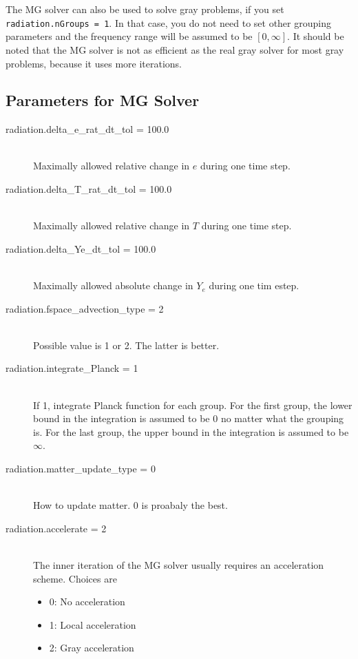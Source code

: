 \documentclass[11pt,letterpaper]{article}
\begin{document}
The MG solver can also be used to solve gray problems, if you set {\tt
  radiation.nGroups = 1}.  In that case, you do not need to set other
grouping parameters and the frequency range will be assumed to be $[0,
\infty]$. It should be noted that the MG solver is not as efficient as
the real gray solver for most gray problems, because it uses more
iterations.

\subsection{Parameters for MG Solver}
\label{sec:mgpar}

\begin{description}
\item[radiation.delta\_e\_rat\_dt\_tol = 100.0] \hfill \\
  Maximally allowed relative change in $e$ during one time step.
\item[radiation.delta\_T\_rat\_dt\_tol = 100.0] \hfill \\
  Maximally allowed relative change in $T$ during one time step.
\item[radiation.delta\_Ye\_dt\_tol = 100.0] \hfill \\
  Maximally allowed absolute change in $Y_e$ during one tim estep.
\item[radiation.fspace\_advection\_type = 2] \hfill \\
  Possible value is 1 or 2.  The latter is better.
\item[radiation.integrate\_Planck = 1] \hfill \\
  If 1, integrate Planck function for each group.  For the first
  group, the lower bound in the integration is assumed to be 0 no
  matter what the grouping is.  For the last group, the upper bound in
  the integration is assumed to be $\infty$.
\item[radiation.matter\_update\_type = 0] \hfill \\
  How to update matter.  0 is proabaly the best.
\item[radiation.accelerate = 2] \hfill \\
  The inner iteration of the MG solver usually requires an
  acceleration scheme.  Choices are
  \begin{itemize}
    \item 0: No acceleration
    \item 1: Local acceleration
    \item 2: Gray acceleration
  \end{itemize}

\end{description}
\end{document}
